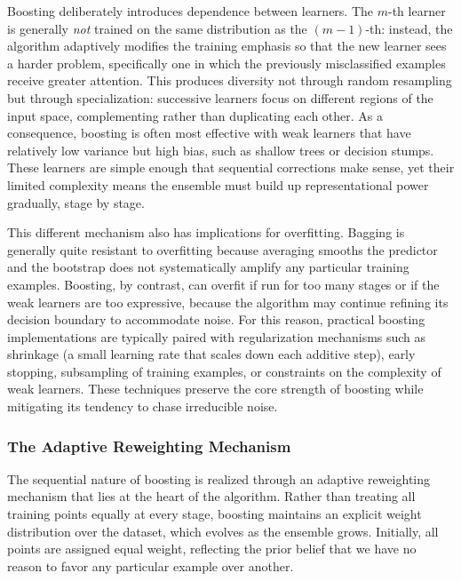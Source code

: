 Boosting deliberately introduces dependence between learners. The $m$-th learner is generally \emph{not} trained on the same distribution as the $(m-1)$-th: instead, the algorithm adaptively modifies the training emphasis so that the new learner sees a harder problem, specifically one in which the previously misclassified examples receive greater attention. This produces diversity not through random resampling but through specialization: successive learners focus on different regions of the input space, complementing rather than duplicating each other. As a consequence, boosting is often most effective with weak learners that have relatively low variance but high bias, such as shallow trees or decision stumps. These learners are simple enough that sequential corrections make sense, yet their limited complexity means the ensemble must build up representational power gradually, stage by stage.

This different mechanism also has implications for overfitting. Bagging is generally quite resistant to overfitting because averaging smooths the predictor and the bootstrap does not systematically amplify any particular training examples. Boosting, by contrast, can overfit if run for too many stages or if the weak learners are too expressive, because the algorithm may continue refining its decision boundary to accommodate noise. For this reason, practical boosting implementations are typically paired with regularization mechanisms such as shrinkage (a small learning rate that scales down each additive step), early stopping, subsampling of training examples, or constraints on the complexity of weak learners. These techniques preserve the core strength of boosting while mitigating its tendency to chase irreducible noise.

\subsubsection*{The Adaptive Reweighting Mechanism}

The sequential nature of boosting is realized through an \alert{adaptive reweighting} mechanism that lies at the heart of the algorithm. Rather than treating all training points equally at every stage, boosting maintains an explicit weight distribution over the dataset, which evolves as the ensemble grows. Initially, all points are assigned equal weight, reflecting the prior belief that we have no reason to favor any particular example over another.

